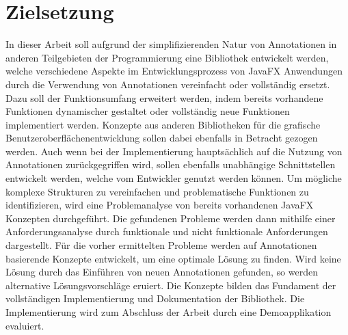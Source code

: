 \section{Zielsetzung}
\label{zielsetzung}
In dieser Arbeit soll aufgrund der simplifizierenden Natur von Annotationen in anderen Teilgebieten der Programmierung eine Bibliothek entwickelt werden, welche verschiedene Aspekte im Entwicklungsprozess von JavaFX Anwendungen durch die Verwendung von Annotationen vereinfacht oder vollständig ersetzt. Dazu soll der Funktionsumfang erweitert werden, indem bereits vorhandene Funktionen dynamischer gestaltet oder vollständig neue Funktionen implementiert werden. Konzepte aus anderen Bibliotheken für die grafische Benutzeroberflächenentwicklung sollen dabei ebenfalls in Betracht gezogen werden. Auch wenn bei der Implementierung hauptsächlich auf die Nutzung von Annotationen zurückgegriffen wird, sollen ebenfalls unabhängige Schnittstellen entwickelt werden, welche vom Entwickler genutzt werden können. Um mögliche komplexe Strukturen zu vereinfachen und problematische Funktionen zu identifizieren, wird eine Problemanalyse von bereits vorhandenen JavaFX Konzepten durchgeführt. Die gefundenen Probleme werden dann mithilfe einer Anforderungsanalyse durch funktionale und nicht funktionale Anforderungen dargestellt. Für die vorher ermittelten Probleme werden auf Annotationen basierende Konzepte entwickelt, um eine optimale Lösung zu finden. Wird keine Lösung durch das Einführen von neuen Annotationen gefunden, so werden alternative Lösungsvorschläge eruiert. Die Konzepte bilden das Fundament der vollständigen Implementierung und Dokumentation der Bibliothek. Die Implementierung wird zum Abschluss der Arbeit durch eine Demoapplikation evaluiert.
